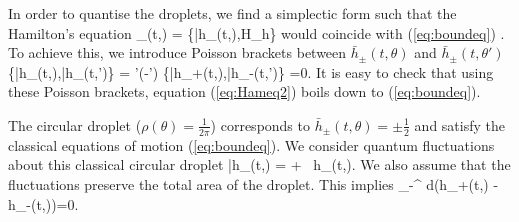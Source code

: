 \documentclass[3p,12pt]{elsarticle}
\numberwithin{equation}{section}
\begin{document}
In order to quantise the droplets, we find a simplectic form such that the Hamilton's equation
%
\be\label{eq:Hameq2}
_{\pm}(t,\theta) = \{\bar h_\pm(t,\theta),H_h\}
\ee
%
would coincide with (\ref{eq:boundeq}) \cite{Grant:2005qc,Maoz:2005nk}. To achieve this, we introduce Poisson brackets between $\bar h_{\pm}(t,\theta)$ and $\bar h_{\pm}(t,\theta')$
%
\ben\label{eq:poisson}
\{\bar h_\pm(t,\theta),\bar h_\pm(t,\theta')\} = \pm {\pi \hbar} \delta'(\theta-\theta')\quad {} \quad \{\bar h_+(t,\theta),\bar h_-(t,\theta')\} =0.
\een
%
It is easy to check that using these Poisson brackets, equation (\ref{eq:Hameq2}) boils down to (\ref{eq:boundeq}).

The circular droplet ($\rho(\theta) =\frac1{2\pi}$) corresponds to $\bar h_\pm(t,\theta)=\pm \frac12$ and satisfy the classical equations of motion (\ref{eq:boundeq}). We consider quantum fluctuations about this classical circular droplet
%
\ben\label{eq:hpmode}
\bar h_{\pm}(t,\theta) = \pm{}+ \hbar\ \tilde h_\pm(t,\theta).
\een
%
We also assume that the fluctuations preserve the total area of the droplet. This implies 
%
\ben\label{eq:tildehcons}
\int_{-\pi}^{\pi} d\theta (\tilde h_+(t,\theta) - \tilde h_-(t,\theta))=0.
\een
%
\end{document}
